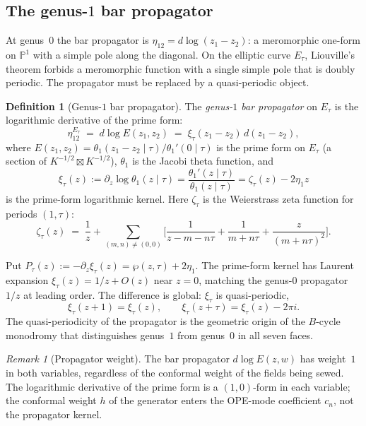 \documentclass[11pt]{article}
\theoremstyle{plain}
\theoremstyle{definition}
\newtheorem{definition}[theorem]{Definition}
\theoremstyle{remark}
\newtheorem{remark}[theorem]{Remark}
\numberwithin{equation}{section}
\begin{document}
\subsection{The genus-$1$ bar propagator}

At genus~$0$ the bar propagator is $\eta_{12} = d\log(z_1 - z_2)$: a
meromorphic one-form on $\mathbb{P}^1$ with a simple pole along the
diagonal. On the elliptic curve $E_\tau$, Liouville's theorem forbids
a meromorphic function with a single simple pole that is doubly
periodic. The propagator must be replaced by a quasi-periodic object.

\begin{definition}[Genus-$1$ bar propagator]\label{def:bar-propagator}
The \emph{genus-$1$ bar propagator} on $E_\tau$ is the logarithmic
derivative of the prime form:
\begin{equation}\label{eq:propagator}
\eta_{12}^{E_\tau}
\;=\;
d\log E(z_1,z_2)
\;=\;
\xi_\tau(z_1 - z_2)\,d(z_1 - z_2),
\end{equation}
where $E(z_1,z_2) = \theta_1(z_1 - z_2 \mid \tau)/\theta_1'(0\mid\tau)$
is the prime form on $E_\tau$ (a section of
$K^{-1/2} \boxtimes K^{-1/2}$), $\theta_1$ is the Jacobi theta
function, and
\[
\xi_\tau(z):=\partial_z\log\theta_1(z\mid\tau)
=\frac{\theta_1'(z\mid\tau)}{\theta_1(z\mid\tau)}
=\zeta_\tau(z)-2\eta_1z
\]
is the prime-form logarithmic kernel. Here \(\zeta_\tau\) is the
Weierstrass zeta function for periods \((1,\tau)\):
\begin{equation}\label{eq:weierstrass-zeta}
\zeta_\tau(z)
\;=\;
\frac{1}{z}
+ \sum_{(m,n) \neq (0,0)}
\biggl[
 \frac{1}{z - m - n\tau}
 + \frac{1}{m + n\tau}
 + \frac{z}{(m + n\tau)^2}
\biggr].
\end{equation}
\end{definition}

Put \(P_\tau(z):=-\partial_z\xi_\tau(z)=\wp(z,\tau)+2\eta_1\).
The prime-form kernel has Laurent expansion
$\xi_\tau(z) = 1/z + O(z)$ near $z = 0$, matching the genus-$0$
propagator $1/z$ at leading order. The difference is global:
$\xi_\tau$ is quasi-periodic,
\begin{equation}\label{eq:quasi-periodicity}
\xi_\tau(z+1) = \xi_\tau(z),
\qquad
\xi_\tau(z+\tau) = \xi_\tau(z) - 2\pi i.
\end{equation}
The quasi-periodicity of the propagator is the geometric origin of the
$B$-cycle monodromy that distinguishes genus~$1$ from genus~$0$ in
all seven faces.

\begin{remark}[Propagator weight]\label{rem:propagator-weight}
The bar propagator $d\log E(z,w)$ has weight~$1$ in both variables,
regardless of the conformal weight of the fields being sewed. The
logarithmic derivative of the prime form is a $(1,0)$-form in each
variable; the conformal weight $h$ of the generator enters the
OPE-mode coefficient $c_n$, not the propagator kernel.
\end{remark}
\end{document}
